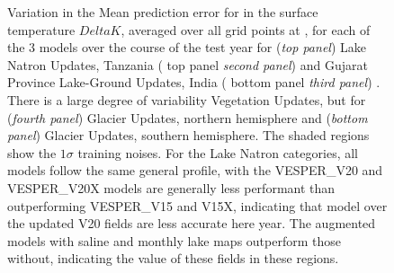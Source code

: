 \documentclass[hess, twostagejnl]{copernicus}
\providecommand{\DIFadd}[1]{{\protect\color{blue} \sf #1}} %
\providecommand{\DIFdel}[1]{{\protect\color{red} \scriptsize #1}} %
\providecommand{\DIFaddFL}[1]{\DIFadd{#1}} %
\providecommand{\DIFdelFL}[1]{\DIFdel{#1}} %
\providecommand{\DIFaddbeginFL}{} %
\providecommand{\DIFaddendFL}{} %
\providecommand{\DIFdelbeginFL}{} %
\providecommand{\DIFdelendFL}{} %
\begin{document}
\begin{figure}
	\DIFaddendFL \caption{\DIFdelbeginFL \DIFdelFL{Variation in the }\DIFdelendFL \DIFaddbeginFL \DIFaddFL{Mean }\DIFaddendFL prediction error \DIFdelbeginFL \DIFdelFL{for }\DIFdelendFL \DIFaddbeginFL \DIFaddFL{in }\DIFaddendFL the \DIFaddbeginFL \DIFaddFL{surface temperature $Delta K$, averaged over all }\DIFaddendFL grid points\DIFdelbeginFL \DIFdelFL{at }\DIFdelendFL \DIFaddbeginFL \DIFaddFL{, for each of the 3 models over the course of the test year for (\textit{top panel}) }\DIFaddendFL Lake \DIFdelbeginFL \DIFdelFL{Natron}\DIFdelendFL \DIFaddbeginFL \DIFaddFL{Updates}\DIFaddendFL , \DIFdelbeginFL \DIFdelFL{Tanzania }\DIFdelendFL (\DIFdelbeginFL \DIFdelFL{top panel}\DIFdelendFL \DIFaddbeginFL \DIFaddFL{\textit{second panel}}\DIFaddendFL ) \DIFdelbeginFL \DIFdelFL{and Gujarat Province}\DIFdelendFL \DIFaddbeginFL \DIFaddFL{Lake-Ground Updates}\DIFaddendFL , \DIFdelbeginFL \DIFdelFL{India }\DIFdelendFL (\DIFdelbeginFL \DIFdelFL{bottom panel}\DIFdelendFL \DIFaddbeginFL \DIFaddFL{\textit{third panel}}\DIFaddendFL ) \DIFdelbeginFL \DIFdelFL{. There is a large degree of variability}\DIFdelendFL \DIFaddbeginFL \DIFaddFL{Vegetation Updates}\DIFaddendFL , \DIFdelbeginFL \DIFdelFL{but for }\DIFdelendFL \DIFaddbeginFL \DIFaddFL{(\textit{fourth panel}) Glacier Updates, northern hemisphere and (\textit{bottom panel}) Glacier Updates, southern hemisphere. The shaded regions show the $1 \sigma$ training noises. For the }\DIFaddendFL Lake \DIFdelbeginFL \DIFdelFL{Natron }\DIFdelendFL \DIFaddbeginFL \DIFaddFL{categories, all models follow }\DIFaddendFL the \DIFaddbeginFL \DIFaddFL{same general profile, with the VESPER\_}\DIFaddendFL V20 and \DIFaddbeginFL \DIFaddFL{VESPER\_}\DIFaddendFL V20X models \DIFdelbeginFL \DIFdelFL{are }\DIFdelendFL generally \DIFdelbeginFL \DIFdelFL{less performant than }\DIFdelendFL \DIFaddbeginFL \DIFaddFL{outperforming VESPER\_}\DIFaddendFL V15 \DIFdelbeginFL \DIFdelFL{and V15X, indicating that }\DIFdelendFL \DIFaddbeginFL \DIFaddFL{model over }\DIFaddendFL the \DIFdelbeginFL \DIFdelFL{updated V20 fields are less accurate here}\DIFdelendFL \DIFaddbeginFL \DIFaddFL{year}\DIFaddendFL .\DIFdelbeginFL \DIFdelFL{The augmented models with saline and monthly lake maps outperform those without, indicating the value of these fields in these regions.}\DIFdelendFL }
	\DIFaddbeginFL \label{fig:timeseries}
\end{figure}
\end{document}
